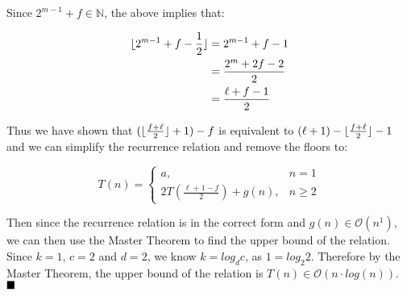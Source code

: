 \documentclass[20pt]{article}
\DeclarePairedDelimiter\floor{\lfloor}{\rfloor}
\begin{document}
\noindent
\begin{text}
    Since $2^{m-1} + f \in \mathbb{N}$, the above implies that:
\end{text}
\begin{align}
    \floor{2^{m-1} + f - \frac{1}{2}} &= 2^{m-1} + f - 1\nonumber\\
    &= \frac{2^m + 2f - 2}{2}\nonumber\\
    &= \frac{\ell + f - 1}{2}\nonumber
\end{align}

\noindent
\begin{text}
    Thus we have shown that $(\floor{\frac{f + \ell}{2}} + 1) - f$ is equivalent to $(\ell + 1) - \floor{\frac{f + \ell}{2}} - 1$ and we can simplify the recurrence relation and remove the floors to:
\end{text}

\begin{equation}
    T(n) = 
    \begin{cases}
      a, & n = 1 \nonumber\\
      2T(\frac{\ell + 1 - f}{2}) + g(n), & n\geq 2\tag{Where $g(n) = (\ell + 1 - f) \cdot c + b$}\nonumber
    \end{cases}
\end{equation}

\noindent
\begin{text}
    Then since the recurrence relation is in the correct form and $g(n) \in \mathcal{O}(n^1)$, we can then use the Master Theorem to find the upper bound of the relation. Since $k = 1$, $c = 2$ and $d = 2$, we know $k = log_{d}c$, as $1 = log_{2}2$. Therefore by the Master Theorem, the upper bound of the relation is $T(n) \in \mathcal{O}(n \cdot log(n))$.\\
    
    $\hfill \blacksquare$
\end{text}
\end{document}
